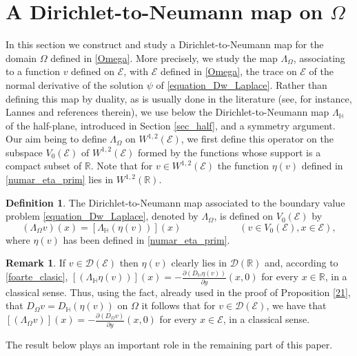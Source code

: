 \documentclass{amsart} %
\numberwithin{equation}{section}
\theoremstyle{definition}
\newtheorem{definition}[theorem]{Definition}
\newtheorem{remark}[theorem]{Remark}
\begin{document}
\section{A Dirichlet-to-Neumann map on \texorpdfstring{$\Omega$}{Omega}} \label{sec_model_bis}
In this section we construct and study a Dirichlet-to-Neumann map for the domain $\Omega$
defined in \eqref{Omega}. More precisely, we study the map $\Lambda_\Omega$, associating to a function $v$
defined on $\mathcal{E}$, with $\mathcal{E}$ defined in \eqref{Omega}, the trace on $\mathcal{E}$
of the normal derivative of the solution $\psi$ of \eqref{equation_Dw_Laplace}.
Rather than defining this map by duality, as is usually done in the literature (see, for instance, Lannes \cite{lannes2024posednessfjohnsfloating}
and references therein), we use below the Dirichlet-to-Neumann map $\Lambda_\mathbb{H}$ of the half-plane, introduced in Section \ref{sec_half}, and a symmetry argument.
Our aim being to define $\Lambda_\Omega$ on $W^{1,2}(\mathcal{E})$, we first define this operator 
on the subspace $V_0(\mathcal{E})$ of $W^{1,2}(\mathcal{E})$ formed by the functions whose support is a compact subset of $\mathbb{R}$.
Note that for $v\in W^{1,2}(\mathcal{E})$ the function $\eta(v)$  defined in \eqref{numar_eta_prim} lies in $W^{1,2}(\mathbb{R})$.

\begin{definition}\label{from_definition}
The Dirichlet-to-Neumann
map associated to the boundary value problem \eqref{equation_Dw_Laplace},
denoted by $\Lambda_\Omega$, is defined on $V_0(\mathcal{E})$ by
\begin{equation}\label{l_restrans}
(\Lambda_\Omega v)(x)=\left[\Lambda_\mathbb{H} (\eta(v))\right](x) \qquad\qquad\qquad(v\in V_0(\mathcal{E}), x\in \mathcal{E}),
\end{equation}
where $\eta(v)$ has been defined in \eqref{numar_eta_prim}.
\end{definition}

\begin{remark}\label{to_understand}
If $v\in \mathcal{D}(\mathcal{E})$ then $\eta(v)$ clearly lies in $\mathcal{D}(\mathbb{R})$
and, according to \eqref{foarte_clasic}, $\left[(\Lambda_\mathbb{H}\eta(v))\right](x)=-\frac{\partial (D_\mathbb{H}\eta(v))}{\partial y}(x,0)$
for every $x\in \mathbb{R}$, in a classical sense. Thus, using the fact, already used in the proof of Proposition \ref{21}, that
$D_\Omega v=D_\mathbb{H}(\eta(v))$ on $\Omega$ it follows that for $v\in \mathcal{D}(\mathcal{E})$, we have that
$\left[(\Lambda_\Omega v)\right](x)=-\frac{\partial (D_\Omega v)}{\partial y}(x,0)$ for every $x\in \mathcal{E}$, in a classical sense.
\end{remark}
The result below plays an important role in the remaining part of this paper.
\end{document}
